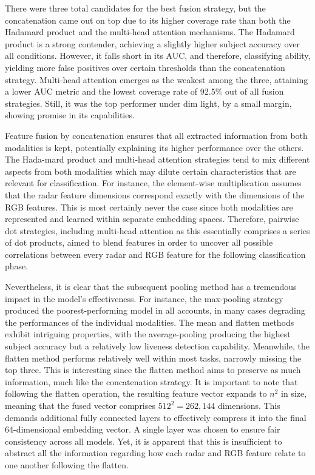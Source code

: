 \documentclass{mpaper}
\begin{document}
There were three total candidates for the best fusion strategy, but the concatenation came out on top due to its higher coverage rate than both the Hadamard product and the multi-head attention mechanisms. The Hadamard product is a strong contender, achieving a slightly higher subject accuracy over all conditions. However, it falls short in its AUC, and therefore, classifying ability, yielding more false positives over certain thresholds than the concatenation strategy. Multi-head attention emerges as the weakest among the three, attaining a lower AUC metric and the lowest coverage rate of 92.5\% out of all fusion strategies. Still, it was the top performer under dim light, by a small margin, showing promise in its capabilities. 

Feature fusion by concatenation ensures that all extracted information from both modalities is kept, potentially explaining its higher performance over the others. The Hada-mard product and multi-head attention strategies tend to mix different aspects from both modalities which may dilute certain characteristics that are relevant for classification. For instance, the element-wise multiplication assumes that the radar feature dimensions correspond exactly with the dimensions of the RGB features. This is most certainly never the case since both modalities are represented and learned within separate embedding spaces. Therefore, pairwise dot strategies, including multi-head attention as this essentially comprises a series of dot products, aimed to blend features in order to uncover all possible correlations between every radar and RGB feature for the following classification phase.

Nevertheless, it is clear that the subsequent pooling method has a tremendous impact in the model's effectiveness. For instance, the max-pooling strategy produced the poorest-performing model in all accounts, in many cases degrading the performances of the individual modalities. The mean and flatten methods exhibit intriguing properties, with the average-pooling producing the highest subject accuracy but a relatively low liveness detection capability. Meanwhile, the flatten method performs relatively well within most tasks, narrowly missing the top three. This is interesting since the flatten method aims to preserve as much information, much like the concatenation strategy. It is important to note that following the flatten operation, the resulting feature vector expands to $n^2$ in size, meaning that the fused vector comprises $512^2 = 262,144$ dimensions. This demands additional fully connected layers to effectively compress it into the final 64-dimensional embedding vector. A single layer was chosen to ensure fair consistency across all models. Yet, it is apparent that this is insufficient to abstract all the information regarding how each radar and RGB feature relate to one another following the flatten.
\end{document}
